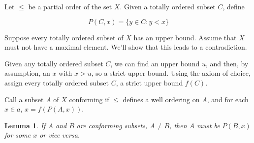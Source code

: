 \documentclass{article}
\newtheorem*{lemma}{Lemma}
\begin{document}
        Let $\leq$ be a partial order of the set $X$. Given a totally ordered
        subset $C$, define

        \[P(C,x) = \{y \in C: y < x\}\]

        Suppose every totally ordered subset of $X$ has an upper bound. Assume
        that $X$ must not have a maximal element. We'll show that this leads to
        a contradiction.

        Given any totally ordered subset $C$, we can find an upper bound $u$,
        and then, by assumption, an $x$ with $x>u$, so a strict upper bound.
        Using the axiom of choice, assign every totally ordered subset $C$, a
        strict upper bound $f(C)$.

        Call a subset $A$ of $X$ conforming if $\leq$ defines a well ordering on
        $A$, and for each $x \in a$, $x = f(P(A,x))$.

        \begin{lemma}
        If $A$ and $B$ are conforming subsets, $A \neq B$, then $A$ must
        be $P(B,x)$ for some $x$ or vice versa.
        \end{lemma}
\end{document}
